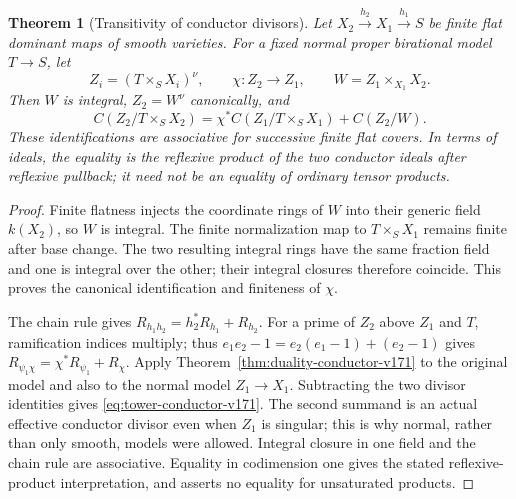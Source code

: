 \documentclass[11pt,reqno]{amsart}
\numberwithin{equation}{section}
\newtheorem{theorem}{Theorem}[section]
\theoremstyle{definition}\newtheorem{definition}[theorem]{Definition}
\theoremstyle{remark}\newtheorem{remark}[theorem]{Remark}
\begin{document}
\begin{theorem}[Transitivity of conductor divisors]
\label{thm:conductor-tower-v171}
Let $X_2\xrightarrow{h_2}X_1\xrightarrow{h_1}S$ be finite flat
dominant maps of smooth varieties. For a fixed normal proper
birational model $T\to S$, let
\[
 Z_i=(T\times_S X_i)^\nu,\qquad
 \chi:Z_2\longrightarrow Z_1,
 \qquad W=Z_1\times_{X_1}X_2.
\]
Then $W$ is integral, $Z_2=W^\nu$ canonically, and
\begin{equation}\label{eq:tower-conductor-v171}
 C(Z_2/T\times_S X_2)
 =\chi^*C(Z_1/T\times_S X_1)+C(Z_2/W).
\end{equation}
These identifications are associative for successive finite flat
covers. In terms of ideals, the equality is the reflexive product
of the two conductor ideals after reflexive pullback; it need not
be an equality of ordinary tensor products.
\end{theorem}
\begin{proof}
Finite flatness injects the coordinate rings of $W$ into their generic
field $k(X_2)$, so $W$ is integral. The finite normalization map to
$T\times_S X_1$ remains finite after base change. The two resulting
integral rings have the same fraction field and one is integral over
the other; their integral closures therefore coincide. This proves the
canonical identification and finiteness of $\chi$.

The chain rule gives
$R_{h_1h_2}=h_2^*R_{h_1}+R_{h_2}$.
For a prime of $Z_2$ above $Z_1$ and $T$, ramification indices multiply;
thus $e_1e_2-1=e_2(e_1-1)+(e_2-1)$ gives
$R_{\psi_1\chi}=\chi^*R_{\psi_1}+R_\chi$.
Apply Theorem~\ref{thm:duality-conductor-v171} to the original model
and also to the normal model $Z_1\to X_1$. Subtracting the two divisor
identities gives \eqref{eq:tower-conductor-v171}. The second summand
is an actual effective conductor divisor even when $Z_1$ is singular;
this is why normal, rather than only smooth, models were allowed.
Integral closure in one field and the chain rule are associative.
Equality in codimension one gives the stated reflexive-product
interpretation, and asserts no equality for unsaturated products.
\end{proof}
\end{document}
